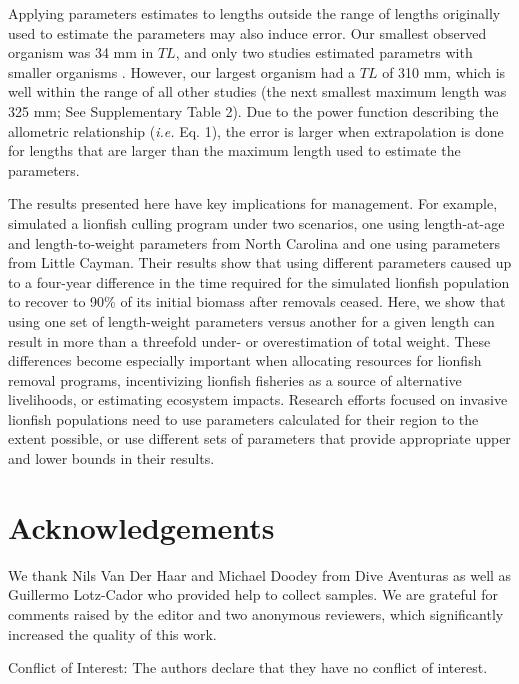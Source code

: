 \documentclass[fleqn,10pt,lineno]{wlpeerj} %
\begin{document}
Applying parameters estimates to lengths outside the range of lengths
originally used to estimate the parameters may also induce error. Our
smallest observed organism was 34 mm in \(TL\), and only two studies
estimated parametrs with smaller organisms
\citep{edwards_2014,sabidoitza_2016}. However, our largest organism had
a \(TL\) of 310 mm, which is well within the range of all other studies
(the next smallest maximum length was 325 mm; See Supplementary Table
2). Due to the power function describing the allometric relationship
(\emph{i.e.} Eq. 1), the error is larger when extrapolation is done for
lengths that are larger than the maximum length used to estimate the
parameters.

The results presented here have key implications for management. For
example, \citet{edwards_2014} simulated a lionfish culling program under
two scenarios, one using length-at-age and length-to-weight parameters
from North Carolina and one using parameters from Little Cayman. Their
results show that using different parameters caused up to a four-year
difference in the time required for the simulated lionfish population to
recover to 90\% of its initial biomass after removals ceased. Here, we
show that using one set of length-weight parameters versus another for a
given length can result in more than a threefold under- or
overestimation of total weight. These differences become especially
important when allocating resources for lionfish removal programs,
incentivizing lionfish fisheries as a source of alternative livelihoods,
or estimating ecosystem impacts. Research efforts focused on invasive
lionfish populations need to use parameters calculated for their region
to the extent possible, or use different sets of parameters that provide
appropriate upper and lower bounds in their results.

\section*{Acknowledgements}

We thank Nils Van Der Haar and Michael Doodey from Dive Aventuras as
well as Guillermo Lotz-Cador who provided help to collect samples. We
are grateful for comments raised by the editor and two anonymous
reviewers, which significantly increased the quality of this work.

Conflict of Interest: The authors declare that they have no conflict of
interest.


\end{document}
